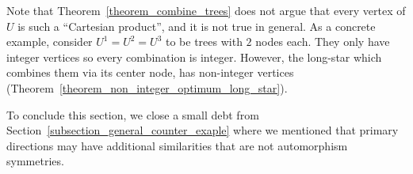 \begin{remark}
\label{remark_combine_trees}
Note that Theorem~\ref{theorem_combine_trees} does not argue that every vertex of $U$ is such a ``Cartesian product'', and it is not true in general. As a concrete example, consider $U^1=U^2=U^3$ to be trees with $2$ nodes each. They only have integer vertices so every combination is integer. However, the long-star which combines them via its center node, has non-integer vertices (Theorem~\ref{theorem_non_integer_optimum_long_star}).
\end{remark}


To conclude this section, we close a small debt from Section~\ref{subsection_general_counter_exaple} where we mentioned that primary directions may have additional similarities that are not automorphism symmetries.

